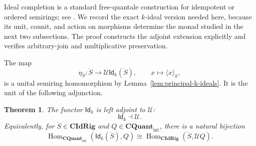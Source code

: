 \documentclass[12pt,leqno]{amsart}
\newcommand{\QuantTop}{\mathbf{CQuant}_{\mathrm{int}}}
\newcommand{\CIdRig}{\mathbf{CIdRig}}
\newcommand{\Idk}{\mathsf{Id}_{k}}
\newtheorem{theorem}{Theorem}[section]
\theoremstyle{definition}
\numberwithin{equation}{section}
\theoremstyle{remark}
\begin{document}
Ideal completion is a standard free-quantale construction for idempotent or ordered semirings; see \cite{NishizawaFurusawa14,Fujii23}. We record the exact $k$-ideal version needed here, because its unit, counit, and action on morphisms determine the monad studied in the next two subsections. The proof constructs the adjoint extension explicitly and verifies arbitrary-join and multiplicative preservation.

The map
\[
\eta_{\ddot S}\colon\ddot S\longrightarrow\mathcal U\Idk(\ddot S),
\qquad
x\longmapsto\langle x\rangle_k,
\]
is a unital semiring homomorphism by Lemma~\ref{lem:principal-k-ideals}. It is the unit of the following adjunction.

\begin{theorem}\label{thm:k-ideal-quantale-adjunction}
The functor \(\Idk\) is left adjoint to \(\mathcal U\):
\[
\Idk\dashv\mathcal U.
\]
Equivalently, for \(\ddot S\in\CIdRig\) and \(Q\in\QuantTop\), there is a natural bijection
\[
\operatorname{Hom}_{\QuantTop}(\Idk(\ddot S),Q)
\cong
\operatorname{Hom}_{\CIdRig}(\ddot S,\mathcal UQ).
\]
\end{theorem}
\end{document}
